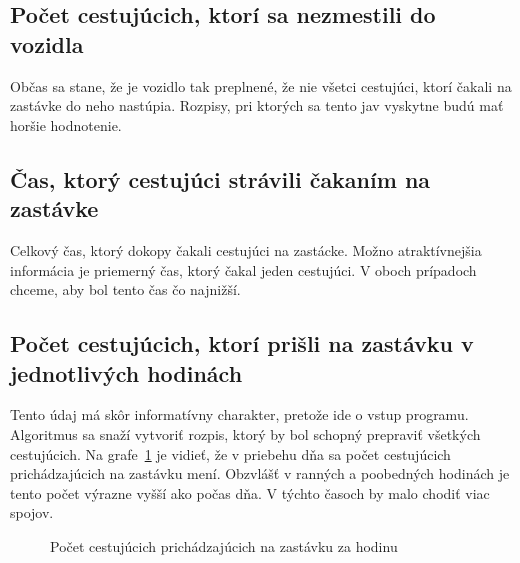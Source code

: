 \subsection*{Počet cestujúcich, ktorí sa nezmestili do vozidla}
Občas sa stane, že je vozidlo tak preplnené, že nie všetci cestujúci, ktorí čakali na zastávke do neho nastúpia.
Rozpisy, pri ktorých sa tento jav vyskytne budú mať horšie hodnotenie.

\subsection*{Čas, ktorý cestujúci strávili čakaním na zastávke}
Celkový čas, ktorý dokopy čakali cestujúci na zastácke.
Možno atraktívnejšia informácia je priemerný čas, ktorý čakal jeden cestujúci.
V oboch prípadoch chceme, aby bol tento čas čo najnižší.

\subsection*{Počet cestujúcich, ktorí prišli na zastávku v jednotlivých hodinách}
Tento údaj má skôr informatívny charakter, pretože ide o vstup programu.
Algoritmus sa snaží vytvoriť rozpis, ktorý by bol schopný prepraviť všetkých cestujúcich.
Na grafe~\ref{fig:passengersArrivedPerHour} je vidieť, že v priebehu dňa sa počet cestujúcich prichádzajúcich na zastávku mení.
Obzvlášť v ranných a poobedných hodinách je tento počet výrazne vyšší ako počas dňa.
V týchto časoch by malo chodiť viac spojov.
\begin{figure}[h]\label{fig:passengersArrivedPerHour}
  \centering
  \caption{Počet cestujúcich prichádzajúcich na zastávku za hodinu}
\end{figure}

